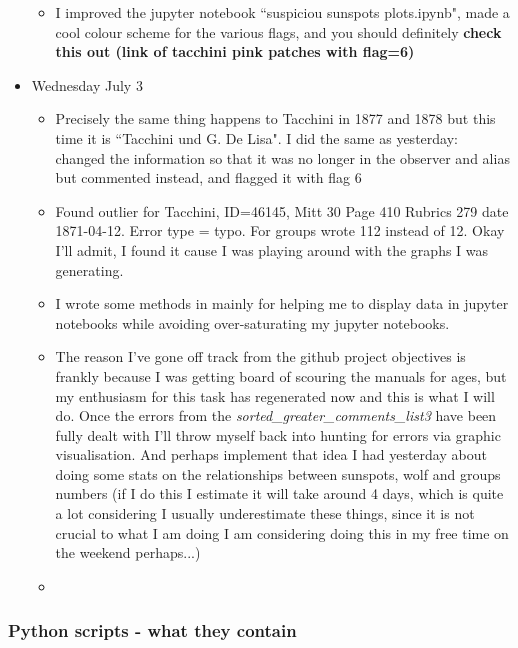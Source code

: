 \documentclass[12pt]{article}
\begin{document}
\begin{itemize}
\begin{itemize}
    \item I improved the jupyter notebook ``suspiciou sunspots plots.ipynb", made a cool colour scheme for the various flags, and you should definitely \textbf{check this out (link of tacchini pink patches with flag=6)}
    \end{itemize}
    
    \item Wednesday July 3
    \begin{itemize}
        \item Precisely the same thing happens to Tacchini in 1877 and 1878 but this time it is ``Tacchini und G. De Lisa". I did the same as yesterday: changed the information so that it was no longer in the observer and alias but commented instead, and flagged it with flag 6
        \item Found outlier for Tacchini, ID=46145, Mitt 30 Page 410 Rubrics 279 date 1871-04-12. Error type = typo. For groups wrote 112 instead of 12. Okay I'll admit, I found it cause I was playing around with the graphs I was generating. 
        \item I wrote some methods in  mainly for helping me to display data in jupyter notebooks while avoiding over-saturating my jupyter notebooks.
        \item The reason I've gone off track from the github project objectives is frankly because I was getting board of scouring the manuals for ages, but my enthusiasm for this task has regenerated now and this is what I will do. Once the errors from the \textit{sorted\_greater\_comments\_list3} have been fully dealt with I'll throw myself back into hunting for errors via graphic visualisation. And perhaps implement that idea I had yesterday about doing some stats on the relationships between sunspots, wolf and groups numbers (if I do this I estimate it will take around 4 days, which is quite a lot considering I usually underestimate these things, since it is not crucial to what I am doing I am considering doing this in my free time on the weekend perhaps...)
        \item 
        
        \end{itemize}
    
    
\end{itemize}

\subsubsection{Python scripts - what they contain}
\end{document}
